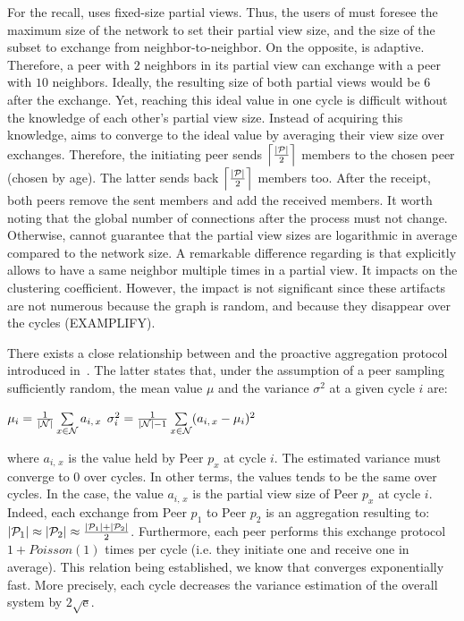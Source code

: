 For the recall, \CYCLON{} uses fixed-size partial views. Thus, the users of
\CYCLON{} must foresee the maximum size of the network to set their partial
view size, and the size of the subset to exchange from neighbor-to-neighbor.
On the opposite, \SCAMPLON{} is adaptive. Therefore, a peer with $2$ neighbors
in its partial view can exchange with a peer with $10$ neighbors. Ideally, the
resulting size of both partial views would be $6$ after the exchange. Yet,
reaching this ideal value in one cycle is difficult without the knowledge of
each other's partial view size. Instead of acquiring this knowledge,
\SCAMPLON{} aims to converge to the ideal value by averaging their view size
over exchanges. Therefore, the initiating peer sends
$\left\lceil|\mathcal{P}|\over{2}\right\rceil$ members to the chosen peer
(chosen by age). The latter sends back
$\left\lceil|\mathcal{P}|\over{2}\right\rceil$ members too. After the receipt,
both peers remove the sent members and add the received members. It worth
noting that the global number of connections after the process must not
change. Otherwise, \SCAMPLON{} cannot guarantee that the partial view sizes are
logarithmic in average compared to the network size.  A remarkable difference
regarding \CYCLON{} is that \SCAMPLON{} explicitly allows to have a same
neighbor multiple times in a partial view. It impacts on the clustering
coefficient. However, the impact is not significant since these artifacts are
not numerous because the graph is random, and because they disappear over the
\SCAMPLON{} cycles (EXAMPLIFY).

There exists a close relationship between \SCAMPLON{} and the proactive
aggregation protocol introduced
in~\cite{jelasity2004epidemic,montresor2004robust}. The latter states that,
under the assumption of a peer sampling sufficiently random, the mean value
$\mu$ and the variance $\sigma^2$ at a given cycle $i$ are:
\begin{center}
  $\mu_i = {1\over{|\mathcal{N}|}} \sum\limits_{x \in \mathcal{N}} a_{i,\,x}$
  \hfill
  $\sigma^2_i = {1\over{|\mathcal{N}|-1}}\sum\limits_{x \in \mathcal{N}}
  (a_{i,\,x} - \mu_i)^2$
\end{center}
where $a_{i,\,x}$ is the value held by Peer $p_x$ at cycle $i$. The estimated
variance must converge to $0$ over cycles. In other terms, the values tends to
be the same over cycles. In the \SCAMPLON{} case, the value $a_{i,\,x}$ is the
partial view size of Peer $p_x$ at cycle $i$. Indeed, each exchange from Peer
$p_1$ to Peer $p_2$ is an aggregation resulting to:
$|\mathcal{P}_1|\approx|\mathcal{P}_2|\approx{|\mathcal{P}_1| + |\mathcal{P}_2|
  \over{2}}$.
Furthermore, each peer performs this exchange protocol $1+Poisson(1)$ times per
cycle (i.e. they initiate one and receive one in average).  This relation being
established, we know that \SCAMPLON{} converges exponentially fast. More
precisely, each cycle decreases the variance estimation of the overall system
by ${2\sqrt{\text{e}}}$.


